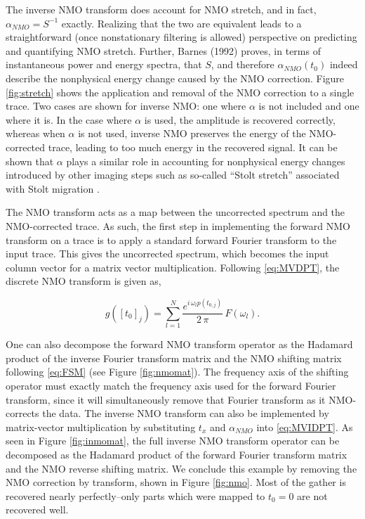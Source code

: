 The inverse NMO transform does account for NMO stretch, and in fact, $\alpha_{NMO}=S^{-1}$ exactly.  Realizing that the two are equivalent leads to a straightforward (once nonstationary filtering is allowed) perspective on predicting and quantifying NMO stretch.  Further, Barnes (1992) proves, in terms of instantaneous power and energy spectra, that $S$, and therefore $\alpha_{NMO}\left( t_0\right) $ indeed describe the nonphysical energy change caused by the NMO correction.
Figure \ref{fig:stretch} shows the application and removal of the NMO correction to a single trace.  
Two cases are shown for inverse NMO: one where $\alpha $ is not included and one where it is.
In the case where $\alpha $ is used, the amplitude is recovered correctly, whereas when $\alpha $ is not used, inverse NMO preserves the energy of the NMO-corrected trace, leading to too much energy in the recovered signal.
It can be shown that $\alpha $ plays a similar role in accounting for nonphysical energy changes introduced by other imaging steps such as so-called ``Stolt stretch'' associated with Stolt migration \cite[]{burnett_ferguson08c}.


The NMO transform acts as a map between the uncorrected spectrum and the NMO-corrected trace.  As such, the first step in implementing the forward NMO transform on a trace is to apply a standard forward Fourier transform to the input trace.  This gives the uncorrected spectrum, which becomes the input column vector for a matrix vector multiplication.  Following \ref{eq:MVDPT}, the discrete NMO transform is given as,

\begin{equation}
	\label{eq:MVNMOT}
	g \left( \left[ t_{0}\right] _j \right) = \sum _{l=1}^N \frac{e^{i \, \omega_l p \left( t_{0,j} \right)}}{2 \, \pi} \, F \left( \omega_l \right).
\end{equation}

One can also decompose the forward NMO transform operator as the Hadamard product of the inverse Fourier transform matrix and the NMO shifting matrix following \ref{eq:FSM} (see Figure \ref{fig:nmomat}).  The frequency axis of the shifting operator must exactly match the frequency axis used for the forward Fourier transform, since it will simultaneously remove that Fourier transform as it NMO-corrects the data. The inverse NMO transform can also be implemented by matrix-vector multiplication by substituting $t_x$ and $\alpha _{NMO}$ into \ref{eq:MVIDPT}.  As seen in Figure \ref{fig:inmomat}, the full inverse NMO transform operator can be decomposed as the Hadamard product of the forward Fourier transform matrix and the NMO reverse shifting matrix.  
We conclude this example by removing the NMO correction by transform, shown in Figure \ref{fig:nmo}.  
Most of the gather is recovered nearly perfectly--only parts which were mapped to $t_0=0$ are not recovered well.

